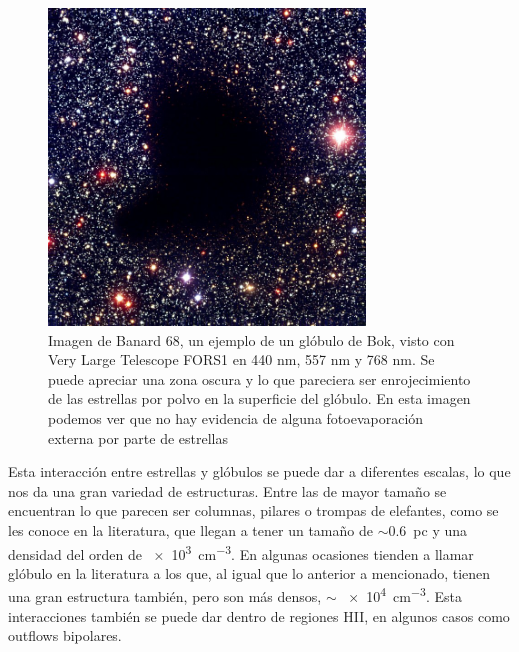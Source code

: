 \documentclass{book}
\begin{document}
\begin{figure}[h]
    \centering
    \includegraphics[width=0.75\textwidth]{images Chapter 1/C1_Bok_globule.jpg}
    \caption{Imagen de Banard 68, un ejemplo de un glóbulo de Bok, visto con Very Large Telescope FORS1 en 440 nm, 557 nm y 768 nm. Se puede apreciar una zona oscura y lo que pareciera ser enrojecimiento de las estrellas por polvo en la superficie del glóbulo. En esta imagen podemos ver que no hay evidencia de alguna fotoevaporación externa por parte de estrellas}
    \label{fig:zones}
\end{figure}

Esta interacción entre estrellas y glóbulos se puede dar a diferentes escalas, lo que nos da una gran variedad de estructuras. Entre las de mayor tamaño se encuentran lo que parecen ser columnas, pilares o trompas de elefantes, como se les conoce en la literatura, que llegan a tener un tamaño de $\sim$\SI{0.6}{pc} y una densidad del orden de \SI{e3}{cm^{-3}}. En algunas ocasiones tienden a llamar glóbulo en la literatura a los que, al igual que lo anterior a mencionado, tienen una gran estructura también, pero son más densos, $\sim$ \SI{e4}{cm^{-3}}. Esta interacciones también se puede dar dentro de regiones HII, en algunos casos como outflows bipolares.
\end{document}

